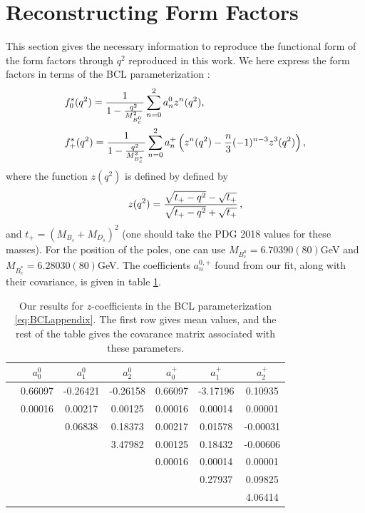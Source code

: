 \FloatBarrier

\section{Reconstructing Form Factors}
\label{sec:reconstructing_formfactors}

This section gives the necessary information to reproduce the functional form of the form factors through $q^2$ reproduced in this work. We here express the form factors in terms of the BCL parameterization \cite{Bourrely:2008za}:
\begin{align}
  \label{eq:BCLappendix}
  &f^s_0(q^2) = {1\over 1 - {q^2\over M_{B_c^0}^2} } \sum_{n=0}^{2} a_n^0 z^n(q^2), \\
  \nonumber
  &f^s_+(q^2) = {1\over 1 - {q^2\over M_{B_c^*}^2} } \sum_{n=0}^{2} a_n^+ \left( z^n(q^2) - {n\over 3} (-1)^{n-3} z^3(q^2) \right), \nonumber
\end{align}
where the function $z(q^2)$ is defined by defined by
\begin{align}
  z(q^2) = {\sqrt{t_+ - q^2} - \sqrt{t_+} \over \sqrt{t_+ - q^2} + \sqrt{t_+} }\,,
\end{align}
and $t_+ = (M_{B_s}+M_{D_s})^2$ (one should take the PDG 2018 values for these masses). For the position of the poles, one can use $M_{B_c^0} = 6.70390(80)$GeV and $M_{B_c^*} = 6.28030(80)$GeV. The coefficients $a_n^{0,+}$ found from our fit, along with their covariance, is given in table \ref{tab:coeffs}.

\begin{table}[htb!]
\begin{center}
\begin{tabular}{ c c c c c c c }
\hline
 & $a^0_0$ & $a^0_1$ & $a^0_2$ & $a^+_0$ & $a^+_1$ & $a^+_2$\\ [0.5ex]
\hline
 & 0.66097 & -0.26421 & -0.26158 & 0.66097 & -3.17196 & 0.10935\\ [1ex]
\hline
 & 0.00016 & 0.00217 & 0.00125 & 0.00016 & 0.00014 & 0.00001\\ [1ex]
 &  & 0.06838 & 0.18373 & 0.00217 & 0.01578 & -0.00031\\ [1ex]
 &  &  & 3.47982 & 0.00125 & 0.18432 & -0.00606\\ [1ex]
 &  &  &  & 0.00016 & 0.00014 & 0.00001\\ [1ex]
 &  &  &  &  & 0.27937 & 0.09825\\ [1ex]
 &  &  &  &  &  & 4.06414\\ [1ex]
\hline
\end{tabular}
    \caption{Our results for $z$-coefficients in the BCL parameterization \eqref{eq:BCLappendix}. The first row gives mean values, and the rest of the table gives the covarance matrix associated with these parameters. \label{tab:coeffs}}
\end{center}
\end{table}




